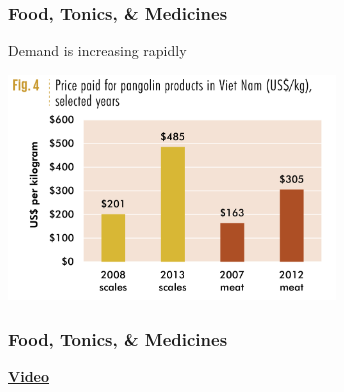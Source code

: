 \documentclass[10pt]{beamer}
\begin{document}
\begin{frame}[t]
\frametitle{Food, Tonics, \& Medicines}
\vspace{0.5cm}

	Demand is increasing rapidly\\
	
	\vspace{0.5cm}
	
	\begin{center}
		\includegraphics[width=0.65\textwidth]{figures/pangolin_demand.png}
	\end{center}
\end{frame}	



\begin{frame}
\frametitle{Food, Tonics, \& Medicines}

	\begin{center}
		\href{https://www.youtube.com/watch?v=DqC3ieJJlFM}{\Large{\textbf{Video}}}	
	\end{center}
\end{frame}	
\end{document}
